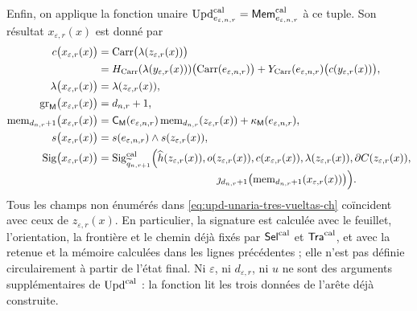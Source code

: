 Enfin, on applique la fonction unaire
\(\operatorname{Upd}^{\rm cal}_{e_{\varepsilon,n,r}}
=\mathsf{Mem}^{\rm cal}_{e_{\varepsilon,n,r}}\) à ce tuple. Son
résultat \(x_{\varepsilon,r}(x)\) est donné par
\begin{equation}
\begin{aligned}
 c\bigl(x_{\varepsilon,r}(x)\bigr)
   &=\operatorname{Carr}\bigl(\lambda(z_{\varepsilon,r}(x))\bigr)\\
   &=H_{\rm Carr}(\lambda(y_{\varepsilon,r}(x)))
       \bigl(\operatorname{Carr}(e_{\varepsilon,n,r})\bigr)
     +Y_{\rm Carr}(e_{\varepsilon,n,r})
       \bigl(c(y_{\varepsilon,r}(x))\bigr),\\
 \lambda\bigl(x_{\varepsilon,r}(x)\bigr)
   &=\lambda(z_{\varepsilon,r}(x)),\\
 \operatorname{gr}_{\mathsf M}
      \bigl(x_{\varepsilon,r}(x)\bigr)
   &=d_{n,r}+1,\\
 \operatorname{mem}_{d_{n,r}+1}
       \bigl(x_{\varepsilon,r}(x)\bigr)
   &=\mathsf C_{\mathsf M}(e_{\varepsilon,n,r})
       \operatorname{mem}_{d_{n,r}}(z_{\varepsilon,r}(x))
     +\kappa_{\mathsf M}(e_{\varepsilon,n,r}),\\
 s\bigl(x_{\varepsilon,r}(x)\bigr)
   &=s(e_{\varepsilon,n,r})\wedge s(z_{\varepsilon,r}(x)),\\
 \operatorname{Sig}\bigl(x_{\varepsilon,r}(x)\bigr)
   &=\operatorname{Sig}^{\rm cal}_{\widetilde q_{n,r+1}}
       \Bigl(\widehat h(z_{\varepsilon,r}(x)),
             o(z_{\varepsilon,r}(x)),
             c(x_{\varepsilon,r}(x)),
             \lambda(z_{\varepsilon,r}(x)),
             \partial C(z_{\varepsilon,r}(x)),\\[-2pt]
   &\hspace{112pt}
             \jmath_{d_{n,r}+1}
              \bigl(\operatorname{mem}_{d_{n,r}+1}
                 (x_{\varepsilon,r}(x))\bigr)\Bigr).
\end{aligned}
\label{eq:upd-unaria-tres-vueltas-ch}
\end{equation}
Tous les champs non énumérés dans \eqref{eq:upd-unaria-tres-vueltas-ch} coïncident avec ceux de \(z_{\varepsilon,r}(x)\). En particulier, la signature est calculée avec le feuillet, l'orientation, la frontière et le chemin déjà fixés par \(\mathsf{Sel}^{\rm cal}\) et \(\mathsf{Tra}^{\rm cal}\), et avec la retenue et la mémoire calculées dans les lignes précédentes ; elle n'est pas définie circulairement à partir de l'état final. Ni \(\varepsilon\), ni \(d_{\varepsilon,r}\), ni \(u\) ne sont des arguments supplémentaires de \(\operatorname{Upd}^{\rm cal}\) : la fonction lit les trois données de l'arête déjà construite.

